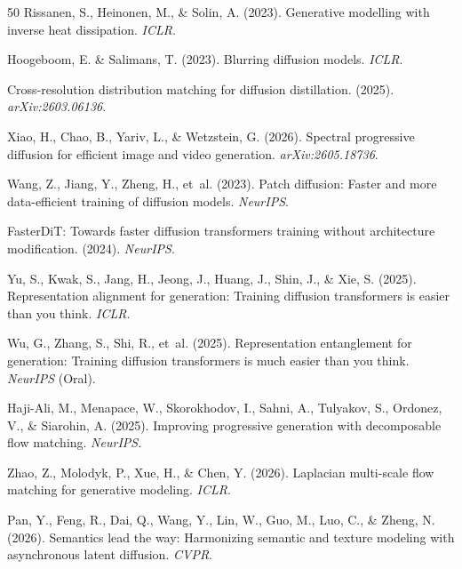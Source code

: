 \documentclass[10pt]{article}
\begin{document}
\begin{thebibliography}{50}
Rissanen, S., Heinonen, M., \& Solin, A. (2023).
\newblock Generative modelling with inverse heat dissipation.
\newblock \emph{ICLR}.

Hoogeboom, E. \& Salimans, T. (2023).
\newblock Blurring diffusion models.
\newblock \emph{ICLR}.

Cross-resolution distribution matching for diffusion distillation. (2025).
\newblock \emph{arXiv:2603.06136}.

Xiao, H., Chao, B., Yariv, L., \& Wetzstein, G. (2026).
\newblock Spectral progressive diffusion for efficient image and video generation.
\newblock \emph{arXiv:2605.18736}.

Wang, Z., Jiang, Y., Zheng, H., et~al. (2023).
\newblock Patch diffusion: Faster and more data-efficient training of diffusion models.
\newblock \emph{NeurIPS}.

FasterDiT: Towards faster diffusion transformers training without architecture modification. (2024).
\newblock \emph{NeurIPS}.

Yu, S., Kwak, S., Jang, H., Jeong, J., Huang, J., Shin, J., \& Xie, S. (2025).
\newblock Representation alignment for generation: Training diffusion transformers is easier than you think.
\newblock \emph{ICLR}.

Wu, G., Zhang, S., Shi, R., et~al. (2025).
\newblock Representation entanglement for generation: Training diffusion transformers is much easier than you think.
\newblock \emph{NeurIPS} (Oral).

Haji-Ali, M., Menapace, W., Skorokhodov, I., Sahni, A., Tulyakov, S., Ordonez, V., \& Siarohin, A. (2025).
\newblock Improving progressive generation with decomposable flow matching.
\newblock \emph{NeurIPS}.

Zhao, Z., Molodyk, P., Xue, H., \& Chen, Y. (2026).
\newblock Laplacian multi-scale flow matching for generative modeling.
\newblock \emph{ICLR}.

Pan, Y., Feng, R., Dai, Q., Wang, Y., Lin, W., Guo, M., Luo, C., \& Zheng, N. (2026).
\newblock Semantics lead the way: Harmonizing semantic and texture modeling with asynchronous latent diffusion.
\newblock \emph{CVPR}.


\end{thebibliography}
\end{document}
